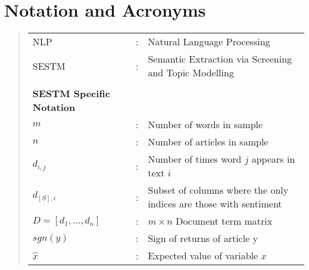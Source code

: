 \documentclass[ oneside,%
                    author={Joshua Felmeden},
                    degree={MEng},
                     title={Sentiment Analysis of Financial Headlines Based on Realised Stock Returns},
                  subtitle={Research}]{dissertation}
\begin{document}

\chapter*{Notation and Acronyms}

\begin{quote}
\noindent
\begin{tabular}{lcl}
NLP               &:    &     Natural Language Processing \\
SESTM             &:    &     Semantic Extraction via Screening and Topic Modelling \\
\\
\textbf{SESTM Specific Notation} \\
$m$               &:    &     Number of words in sample \\
$n$               &:    &     Number of articles in sample \\
$d_{i,j}$         &:    &     Number of times word $j$ appears in text $i$ \\
$d_{[S],i}$       &:    &     Subset of columns where the only indices are those with sentiment \\
$D = [d_1, \dots, d_n]$ &:    & $m \times n$ Document term matrix \\
$sgn(y)$          &:    &     Sign of returns of article y \\
$\hat x$          &:    &    Expected value of variable $x$ \\
\end{tabular}
\end{quote}



%

\mainmatter



\end{document}
